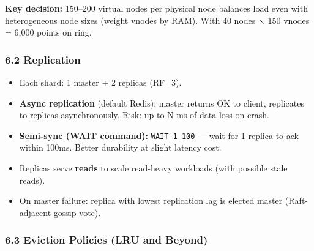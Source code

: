 \documentclass[11pt]{article}
\providecommand{\tightlist}{\setlength{\itemsep}{1pt}\setlength{\parskip}{0pt}}
\begin{document}
\textbf{Key decision:} 150--200 virtual nodes per physical node balances load even with heterogeneous node sizes (weight vnodes by RAM). With 40 nodes \(\times\) 150 vnodes = 6,000 points on ring.

\subsubsection{6.2 Replication}\label{62-replication}

\begin{itemize}
\tightlist
\item
  Each shard: 1 master + 2 replicas (RF=3).
\item
  \textbf{Async replication} (default Redis): master returns OK to client, replicates to replicas asynchronously. Risk: up to N ms of data loss on crash.
\item
  \textbf{Semi-sync (WAIT command):} \texttt{WAIT\ 1\ 100} --- wait for 1 replica to ack within 100ms. Better durability at slight latency cost.
\item
  Replicas serve \textbf{reads} to scale read-heavy workloads (with possible stale reads).
\item
  On master failure: replica with lowest replication lag is elected master (Raft-adjacent gossip vote).
\end{itemize}

\subsubsection{6.3 Eviction Policies (LRU and Beyond)}\label{63-eviction-policies-lru-and-beyond}
\end{document}
